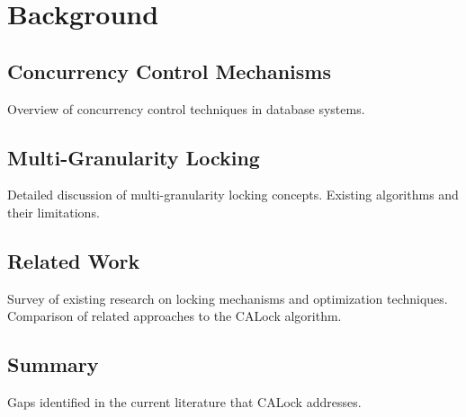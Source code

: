 %


\chapter{Background}
\section{Concurrency Control Mechanisms}
Overview of concurrency control techniques in database systems.

\section{Multi-Granularity Locking}
Detailed discussion of multi-granularity locking concepts. Existing algorithms and their limitations.

\section{Related Work}
Survey of existing research on locking mechanisms and optimization techniques. Comparison of related approaches to the CALock algorithm.

\section{Summary}
Gaps identified in the current literature that CALock addresses.
